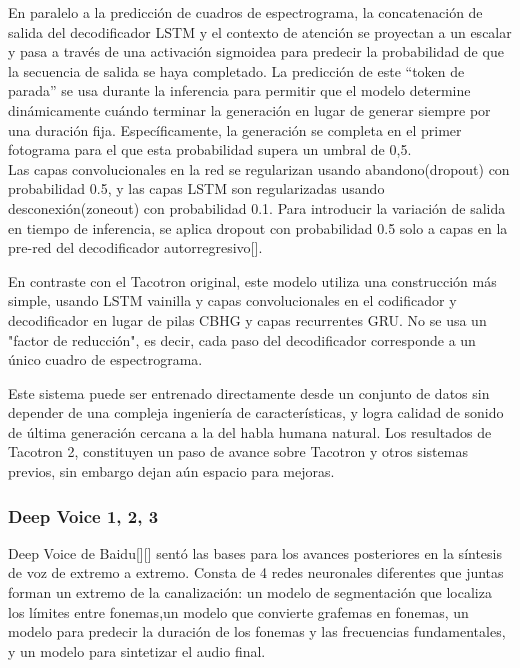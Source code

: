 En paralelo a la predicción de cuadros de espectrograma, la concatenación de
salida del decodificador LSTM y el contexto de atención se proyectan a un escalar y pasa a través de una activación sigmoidea para predecir la probabilidad de que la secuencia de salida se haya completado. La predicción de este ``token de parada'' se usa durante la inferencia para permitir que el modelo determine dinámicamente cuándo terminar la generación en lugar de generar siempre por una duración fija. Específicamente, la generación se completa en el primer fotograma para el que esta probabilidad supera un umbral de 0,5.\\

Las capas convolucionales en la red se regularizan usando abandono(dropout) con probabilidad 0.5, y las capas LSTM son regularizadas usando desconexión(zoneout) con probabilidad 0.1. Para introducir la variación de salida en tiempo de inferencia, se aplica dropout con probabilidad 0.5 solo a capas en la pre-red del decodificador autorregresivo[\cite{shen2018natural}].


En contraste con el Tacotron original, este modelo utiliza una construcción más simple, usando LSTM vainilla y capas convolucionales en el codificador y decodificador en lugar de pilas CBHG y capas recurrentes GRU. No se usa un "factor de reducción", es decir, cada paso del decodificador corresponde a un único cuadro de espectrograma.

Este sistema puede ser entrenado directamente desde un conjunto de datos sin depender de una compleja ingeniería de características, y logra calidad de sonido de última generación cercana a la del habla humana natural. Los resultados de Tacotron 2, constituyen un paso de avance sobre Tacotron y otros sistemas previos, sin embargo dejan aún espacio para mejoras. 


\subsubsection{Deep Voice 1, 2, 3}
Deep Voice de Baidu[\cite{deep-voice}][\cite{arik2018neural}] sentó las bases para los avances posteriores en la síntesis de voz de extremo a extremo. Consta de 4 redes neuronales diferentes que juntas forman un extremo de la canalización: un modelo de segmentación que localiza los límites entre fonemas,un modelo que convierte grafemas en fonemas, un modelo para predecir la duración de los fonemas y las frecuencias fundamentales, y un modelo para sintetizar el audio final.

